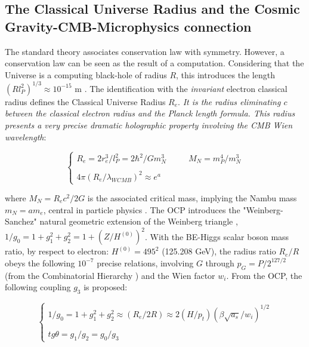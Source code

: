 \documentclass[a4paper,9pt]{article}
\begin{document}
% 

\subsection{The Classical Universe Radius and the Cosmic Gravity-CMB-Microphysics connection}

The standard theory associates conservation law with symmetry. However, a conservation law can be seen as the result of a computation. Considering that the Universe is a computing black-hole of radius $R$, this introduces the length $(Rl_P^2)^{1/3} \approx 10^{-15} $ m \cite{Sanchez5}. The identification with the \textit{invariant} electron classical radius defines the Classical Universe Radius $R_e$. \textit{It is the radius eliminating $c$ between the classical electron radius and the Planck length formula. This radius presents a very precise dramatic holographic property involving the CMB Wien wavelength}:

\begin{equation}
 \left\{
    \begin{array}{ll}
    R_e = 2r_e^3/l_P^2 = 2 \hbar^2/Gm_N^3 ~~~~~~~~~~~~ M_N = m_P^4/m_N^3 \\
    \\
   4\pi(R_e/\lambda_{WCMB})^2 \approx e^a
    \end{array}
\right.
\end{equation}

    
where $M_N = R_ec^2/2G $ is the associated critical mass, implying the Nambu mass $m_N = am_e$, central in particle physics \cite{Nambu}. The OCP introduces the "Weinberg-Sanchez" natural geometric extension of the Weinberg triangle \cite{Taylor}, $1/g_0 = 1+g_1^2 +g_2^2 = 1 + (Z/H^{(0)})^2$. With the BE-Higgs scalar boson mass ratio, by respect to electron:  $H^{(0)} = 495^2$ (125.208 GeV)\cite{Sanchez2}, the radius ratio $R_e/R$ obeys the following $10^{-7}$ precise relations, involving $G$ through $p_G = P/2^{127/2}$ (from the Combinatorial Hierarchy \cite{Bastin}) and the Wien factor $w_i$. From the OCP, the following coupling $g_3$ is proposed: 


\begin{equation}
 \left\{
    \begin{array}{ll}
    1/g_0 = 1+g_1^2 +g_2^2 \approx (R_e/2R) \approx 2(H/p_t)(\beta \sqrt {a_s}/w_i)^{1/2}\\
  \\
   tg \theta =  g_1/g_2 = g_0/g_3
    
    \end{array}
\right.
\end{equation}
\end{document}
